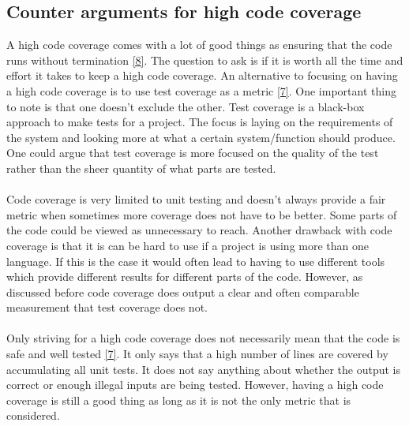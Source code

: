 \documentclass{article}
\begin{document}
\subsection{Counter arguments for high code coverage}
A high code coverage comes with a lot of good things as ensuring that the code runs without termination \hyperlink{8}{[8]}. The question to ask is if it is worth all the time and effort it takes to keep a high code coverage. An alternative to focusing on having a high code coverage is to use test coverage as a metric \hyperlink{7}{[7]}. One important thing to note is that one doesn't exclude the other. Test coverage is a black-box approach to make tests for a project. The focus is laying on the requirements of the system and looking more at what a certain system/function should produce. One could argue that test coverage is more focused on the quality of the test rather than the sheer quantity of what parts are tested.
\\\\
Code coverage is very limited to unit testing and doesn't always provide a fair metric when sometimes more coverage does not have to be better. Some parts of the code could be viewed as unnecessary to reach. Another drawback with code coverage is that it is can be hard to use if a project is using more than one language. If this is the case it would often lead to having to use different tools which provide different results for different parts of the code. However, as discussed before code coverage does output a clear and often comparable measurement that test coverage does not.
\\\\
Only striving for a high code coverage does not necessarily mean that the code is safe and well tested \hyperlink{7}{[7]}. It only says that a high number of lines are covered by accumulating all unit tests. It does not say anything about whether the output is correct or enough illegal inputs are being tested. However, having a high code coverage is still a good thing as long as it is not the only metric that is considered.
\end{document}
